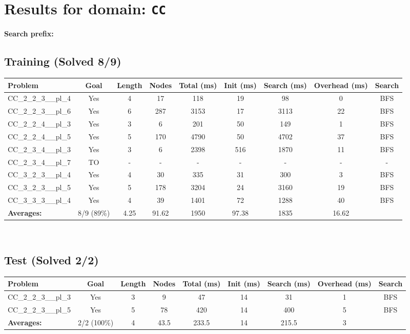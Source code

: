 \documentclass{article}
\begin{document}
\section*{Results for domain: \texttt{CC}}
\textbf{Search prefix:} 
\\[0.5cm]
\subsection*{Training (Solved 8/9)}
\begin{tabular}{lcccccccc}
\toprule
Problem & Goal & Length & Nodes & Total (ms) & Init (ms) & Search (ms) & Overhead (ms) & Search \\
\midrule
CC\_2\_2\_3\_\_pl\_4 & Yes & 4 & 17 & 118 & 19 & 98 & 0 & BFS \\
CC\_2\_2\_3\_\_pl\_6 & Yes & 6 & 287 & 3153 & 17 & 3113 & 22 & BFS \\
CC\_2\_2\_4\_\_pl\_3 & Yes & 3 & 6 & 201 & 50 & 149 & 1 & BFS \\
CC\_2\_2\_4\_\_pl\_5 & Yes & 5 & 170 & 4790 & 50 & 4702 & 37 & BFS \\
CC\_2\_3\_4\_\_pl\_3 & Yes & 3 & 6 & 2398 & 516 & 1870 & 11 & BFS \\
CC\_2\_3\_4\_\_pl\_7 & TO & - & - & - & - & - & - & - \\
CC\_3\_2\_3\_\_pl\_4 & Yes & 4 & 30 & 335 & 31 & 300 & 3 & BFS \\
CC\_3\_2\_3\_\_pl\_5 & Yes & 5 & 178 & 3204 & 24 & 3160 & 19 & BFS \\
CC\_3\_3\_3\_\_pl\_4 & Yes & 4 & 39 & 1401 & 72 & 1288 & 40 & BFS \\
\textbf{Averages:} & 8/9 (89\%) & 4.25 & 91.62 & 1950 & 97.38 & 1835 & 16.62 & \\
\bottomrule
\end{tabular}
\\[0.7cm]
\subsection*{Test (Solved 2/2)}
\begin{tabular}{lcccccccc}
\toprule
Problem & Goal & Length & Nodes & Total (ms) & Init (ms) & Search (ms) & Overhead (ms) & Search \\
\midrule
CC\_2\_2\_3\_\_pl\_3 & Yes & 3 & 9 & 47 & 14 & 31 & 1 & BFS \\
CC\_2\_2\_3\_\_pl\_5 & Yes & 5 & 78 & 420 & 14 & 400 & 5 & BFS \\
\textbf{Averages:} & 2/2 (100\%) & 4 & 43.5 & 233.5 & 14 & 215.5 & 3 & \\
\bottomrule
\end{tabular}
\\[0.7cm]
\end{document}
